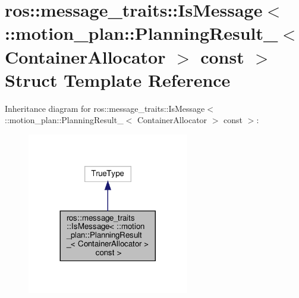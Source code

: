 \hypertarget{structros_1_1message__traits_1_1IsMessage_3_01_1_1motion__plan_1_1PlanningResult___3_01ContainerAllocator_01_4_01const_01_4}{}\section{ros\+:\+:message\+\_\+traits\+:\+:Is\+Message$<$ \+:\+:motion\+\_\+plan\+:\+:Planning\+Result\+\_\+$<$ Container\+Allocator $>$ const $>$ Struct Template Reference}
\label{structros_1_1message__traits_1_1IsMessage_3_01_1_1motion__plan_1_1PlanningResult___3_01ContainerAllocator_01_4_01const_01_4}


Inheritance diagram for ros\+:\+:message\+\_\+traits\+:\+:Is\+Message$<$ \+:\+:motion\+\_\+plan\+:\+:Planning\+Result\+\_\+$<$ Container\+Allocator $>$ const $>$\+:
\nopagebreak
\begin{figure}[H]
\begin{center}
\leavevmode
\includegraphics[width=200pt]{structros_1_1message__traits_1_1IsMessage_3_01_1_1motion__plan_1_1PlanningResult___3_01Container7f6baf2a0d2d6dda879bfddf50ecb3aa}
\end{center}
\end{figure}


